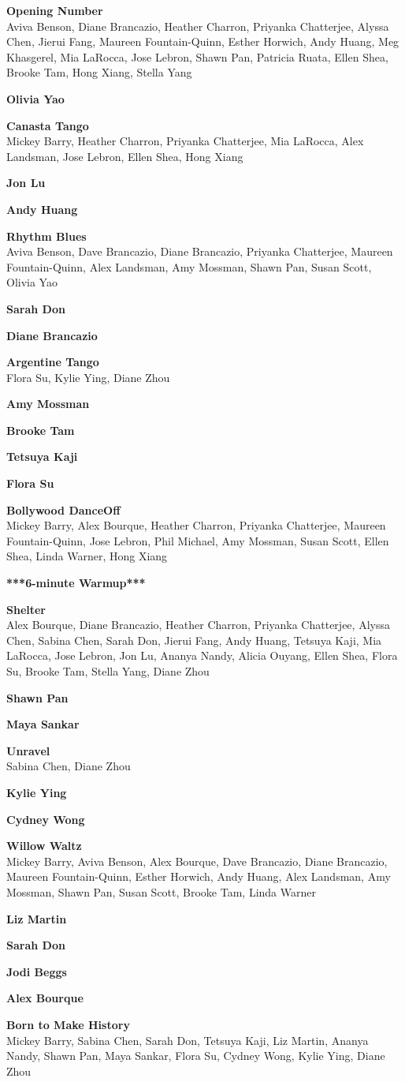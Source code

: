 \documentclass[12pt]{article}
\newcommand{\programnumber}[2]{{

  \vspace{0.1in}

  \textbf{#1}\\

  {\footnotesize #2}

}}
\begin{document}
\begin{multicols*}{2}
\begin{center}
\programnumber{Opening Number}{Aviva Benson, Diane Brancazio, Heather Charron, Priyanka Chatterjee, Alyssa Chen, Jierui Fang, Maureen Fountain-Quinn, Esther Horwich, Andy Huang, Meg Khasgerel, Mia LaRocca, Jose Lebron, Shawn Pan, Patricia Ruata, Ellen Shea, Brooke Tam, Hong Xiang, Stella Yang}
\programnumber{Olivia Yao}{}
\programnumber{Canasta Tango}{Mickey Barry, Heather Charron, Priyanka Chatterjee, Mia LaRocca, Alex Landsman, Jose Lebron, Ellen Shea, Hong Xiang}
\programnumber{Jon Lu}{}
\programnumber{Andy Huang}{}
\programnumber{Rhythm Blues}{Aviva Benson, Dave Brancazio, Diane Brancazio, Priyanka Chatterjee, Maureen Fountain-Quinn, Alex Landsman, Amy Mossman, Shawn Pan, Susan Scott, Olivia Yao}
\programnumber{Sarah Don}{}
\programnumber{Diane Brancazio}{}
\programnumber{Argentine Tango}{Flora Su, Kylie Ying, Diane Zhou}
\programnumber{Amy Mossman}{}
\programnumber{Brooke Tam}{}
\programnumber{Tetsuya Kaji}{}
\programnumber{Flora Su}{}
\programnumber{Bollywood DanceOff}{Mickey Barry, Alex Bourque, Heather Charron, Priyanka Chatterjee, Maureen Fountain-Quinn, Jose Lebron, Phil Michael, Amy Mossman, Susan Scott, Ellen Shea, Linda Warner, Hong Xiang}
\programnumber{***6-minute Warmup***}{}
\programnumber{Shelter}{Alex Bourque, Diane Brancazio, Heather Charron, Priyanka Chatterjee, Alyssa Chen, Sabina Chen, Sarah Don, Jierui Fang, Andy Huang, Tetsuya Kaji, Mia LaRocca, Jose Lebron, Jon Lu, Ananya Nandy, Alicia Ouyang, Ellen Shea, Flora Su, Brooke Tam, Stella Yang, Diane Zhou}
\programnumber{Shawn Pan}{}
\programnumber{Maya Sankar}{}
\programnumber{Unravel}{Sabina Chen, Diane Zhou}
\programnumber{Kylie Ying}{}
\programnumber{Cydney Wong}{}
\programnumber{Willow Waltz}{Mickey Barry, Aviva Benson, Alex Bourque, Dave Brancazio, Diane Brancazio, Maureen Fountain-Quinn, Esther Horwich, Andy Huang, Alex Landsman, Amy Mossman, Shawn Pan, Susan Scott, Brooke Tam, Linda Warner}
\programnumber{Liz Martin}{}
\programnumber{Sarah Don}{}
\programnumber{Jodi Beggs}{}
\programnumber{Alex Bourque}{}
\programnumber{Born to Make History}{Mickey Barry, Sabina Chen, Sarah Don, Tetsuya Kaji, Liz Martin, Ananya Nandy, Shawn Pan, Maya Sankar, Flora Su, Cydney Wong, Kylie Ying, Diane Zhou}





\end{center}

\end{multicols*}
\end{document}

